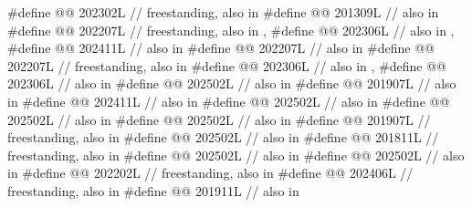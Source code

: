 \begin{codeblock}
#define @@          202302L // freestanding, also in 
#define @@                      201309L // also in 
#define @@                          202207L
  // freestanding, also in , 
#define @@              202306L // also in , 
#define @@                  202411L // also in 
#define @@                  202207L // also in 
#define @@                202207L // freestanding, also in 
#define @@                   202306L // also in , 
#define @@                 202306L // also in 
#define @@                   202502L // also in 
#define @@           201907L // also in 
#define @@              202411L // also in 
#define @@                202502L // also in 
#define @@                202502L // also in 
#define @@            202502L // also in 
#define @@              201907L // freestanding, also in 
#define @@          202502L // also in 
#define @@                201811L // freestanding, also in 
#define @@                    202502L // also in 
#define @@                     202502L // also in 
#define @@                  202202L // freestanding, also in 
#define @@                     202406L // freestanding, also in 
#define @@                 201911L // also in 

\end{codeblock}
